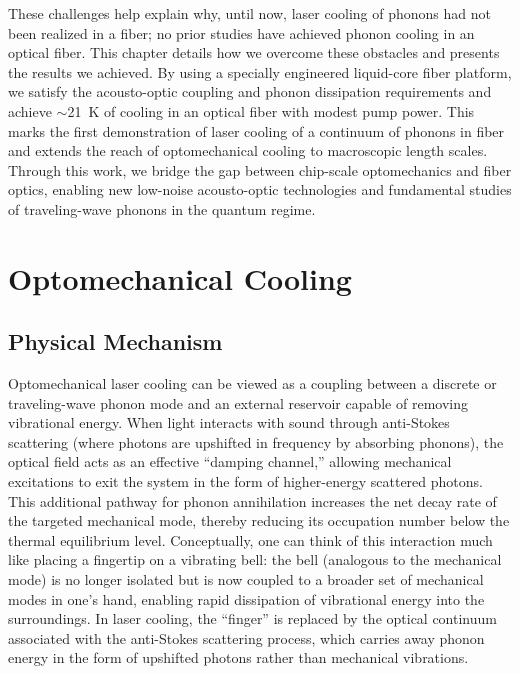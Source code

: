 These challenges help explain why, until now, laser cooling of phonons had not been realized in a fiber; no prior studies have achieved phonon cooling in an optical fiber. This chapter details how we overcome these obstacles and presents the results we achieved. By using a specially engineered liquid-core fiber platform, we satisfy the acousto-optic coupling and phonon dissipation requirements and achieve \(\sim\)\SI{21}{\kelvin} of cooling in an optical fiber with modest pump power. This marks the first demonstration of laser cooling of a continuum of phonons in fiber and extends the reach of optomechanical cooling to macroscopic length scales. Through this work, we bridge the gap between chip-scale optomechanics and fiber optics, enabling new low-noise acousto-optic technologies and fundamental studies of traveling-wave phonons in the quantum regime.


\section{Optomechanical Cooling}
\label{Cooling:sec:Optomechanical Cooling}

\subsection{Physical Mechanism}
\label{Cooling:subsec:PhysicalMechanism}

Optomechanical laser cooling can be viewed as a coupling between a discrete or traveling-wave phonon mode and an external reservoir capable of removing vibrational energy. When light interacts with sound through anti-Stokes scattering (where photons are upshifted in frequency by absorbing phonons), the optical field acts as an effective “damping channel,” allowing mechanical excitations to exit the system in the form of higher-energy scattered photons. This additional pathway for phonon annihilation increases the net decay rate of the targeted mechanical mode, thereby reducing its occupation number below the thermal equilibrium level. Conceptually, one can think of this interaction much like placing a fingertip on a vibrating bell: the bell (analogous to the mechanical mode) is no longer isolated but is now coupled to a broader set of mechanical modes in one’s hand, enabling rapid dissipation of vibrational energy into the surroundings. In laser cooling, the “finger” is replaced by the optical continuum associated with the anti-Stokes scattering process, which carries away phonon energy in the form of upshifted photons rather than mechanical vibrations.

